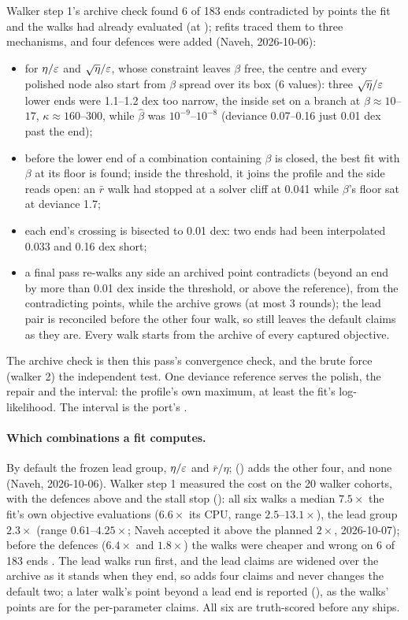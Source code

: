 Walker step 1's archive check found 6 of 183 ends contradicted by points the fit and the walks had already evaluated
(at ); refits traced them to three mechanisms, and four defences were added (Naveh, 2026-10-06):
\begin{itemize}[nosep]
  \item for $\eta/\varepsilon$ and $\sqrt\eta/\varepsilon$, whose constraint leaves $\beta$ free, the centre and every polished node
    also start from $\beta$ spread over its box (6 values): three $\sqrt\eta/\varepsilon$ lower ends were 1.1--1.2 dex too
    narrow, the inside set on a branch at $\beta\approx10$--$17$, $\kappa\approx160$--$300$, while $\hat\beta$ was
    $10^{-9}$--$10^{-8}$ (deviance 0.07--0.16 just 0.01 dex past the end);
  \item before the lower end of a combination containing $\beta$ is closed, the best fit with $\beta$ at its floor is
    found; inside the threshold, it joins the profile and the side reads open: an $\bar r$ walk had stopped at a solver
    cliff at 0.041 while $\beta$'s floor sat at deviance 1.7;
  \item each end's crossing is bisected to 0.01 dex: two ends had been interpolated 0.033 and 0.16 dex short;
  \item a final pass re-walks any side an archived point contradicts (beyond an end by more than 0.01 dex inside the
    threshold, or above the reference), from the contradicting points, while the archive grows (at most 3 rounds);
    the lead pair is reconciled before the other four walk, so  still leaves the default claims as they
    are. Every walk starts from the archive of every captured objective.
\end{itemize}
The archive check is then this pass's convergence check, and the brute force (walker 2) the independent test.
One deviance reference serves the polish, the repair and the interval: the profile's own maximum, at least the
fit's log-likelihood. The interval is the port's .

\paragraph{Which combinations a fit computes.} By default the frozen lead group, $\eta/\varepsilon$ and $\bar r/\eta$;
 () adds the other four, and  none (Naveh,
2026-10-06). Walker step 1 measured the cost on the 20 walker cohorts, with the defences above and the stall stop
(): all six walks a median $7.5\times$ the fit's own objective evaluations ($6.6\times$ its CPU, range
$2.5$--$13.1\times$), the lead group $2.3\times$ (range $0.61$--$4.25\times$; Naveh accepted it above the planned $2\times$,
2026-10-07); before the defences ($6.4\times$ and $1.8\times$) the walks were cheaper and wrong on 6 of 183 ends
. The lead walks run first, and the lead claims are widened over
the archive as it stands when they end, so  adds four claims and never changes the default two; a later
walk's point beyond a lead end is reported (), as the walks' points are for the
per-parameter claims. All six are truth-scored before any ships.

